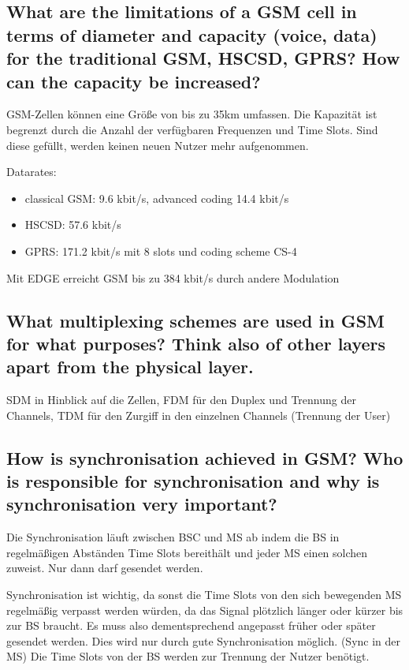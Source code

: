\subsection{What are the limitations of a GSM cell in terms of diameter and capacity (voice, data) for the traditional GSM, HSCSD, GPRS? How can the capacity be increased?}

GSM-Zellen können eine Größe von bis zu 35km umfassen. Die Kapazität ist begrenzt durch die Anzahl der verfügbaren Frequenzen und Time Slots. Sind diese gefüllt, werden keinen neuen Nutzer mehr aufgenommen.

Datarates:

\begin{itemize}
\item classical GSM: 9.6 kbit/s, advanced coding 14.4 kbit/s

\item HSCSD: 57.6 kbit/s 

\item GPRS: 171.2 kbit/s mit 8 slots und coding scheme CS-4
\end{itemize}

Mit EDGE erreicht GSM bis zu 384 kbit/s durch andere Modulation

\subsection{What multiplexing schemes are used in GSM for what purposes? Think also of other layers apart from the physical layer.}

SDM in Hinblick auf die Zellen, FDM für den Duplex und Trennung der Channels, TDM für den Zurgiff in den einzelnen Channels (Trennung der User)

\subsection{How is synchronisation achieved in GSM? Who is responsible for synchronisation and why is synchronisation very important?}

Die Synchronisation läuft zwischen BSC und MS ab indem die BS in regelmäßigen Abständen Time Slots bereithält und jeder MS einen solchen zuweist. Nur dann darf gesendet werden.

Synchronisation ist wichtig, da sonst die Time Slots von den sich bewegenden MS regelmäßig verpasst werden würden, da das Signal plötzlich länger oder kürzer bis zur BS braucht. Es muss also dementsprechend angepasst früher oder später gesendet werden. Dies wird nur durch gute Synchronisation möglich. (Sync in der MS)
Die Time Slots von der BS werden zur Trennung der Nutzer benötigt.

